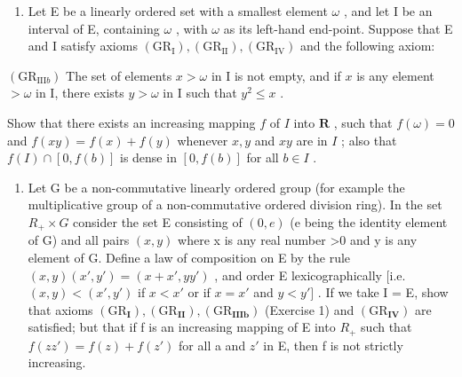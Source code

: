 \ExerciseSection

\begin{enumerate}
\def\labelenumi{\arabic{enumi})}
\tightlist
\item
  Let E be a linearly ordered set with a smallest element \(\omega\) , and let I be an interval of E, containing \(\omega\) , with \(\omega\) as its left-hand end-point. Suppose that E and I satisfy axioms \((\mathrm{GR}_{\mathrm{I}}), (\mathrm{GR}_{\mathrm{II}}), (\mathrm{GR}_{\mathrm{IV}})\) and the following axiom:
\end{enumerate}

\((\mathrm{GR}_{\mathrm{III}b})\) The set of elements \(x > \omega\) in I is not empty, and if \(x\) is any element \(> \omega\) in I, there exists \(y > \omega\) in I such that \(y^2 \leqslant x\) .

Show that there exists an increasing mapping \(f\) of \(I\) into \(\mathbf{R}\) , such that \(f(\omega) = 0\) and \(f(xy) = f(x) + f(y)\) whenever \(x, y\) and \(xy\) are in \(I\) ; also that \(f(I) \cap [0, f(b)]\) is dense in \([0, f(b)]\) for all \(b \in I\) .

\begin{enumerate}
\def\labelenumi{\arabic{enumi})}
\setcounter{enumi}{1}
\tightlist
\item
  Let G be a non-commutative linearly ordered group (for example the multiplicative group of a non-commutative ordered division ring). In the set \(R_{+} \times G\) consider the set E consisting of \((0, e)\) (e being the identity element of G) and all pairs \((x, y)\) where x is any real number \textgreater0 and y is any element of G. Define a law of composition on E by the rule \((x, y)(x', y') = (x + x', yy')\) , and order E lexicographically {[}i.e.~\((x, y) < (x', y')\) if \(x < x'\) or if \(x = x'\) and \(y < y']\) . If we take I = E, show that axioms \((\mathrm{GR}_{\mathbf{I}}), (\mathrm{GR}_{\mathbf{II}}), (\mathrm{GR}_{\mathbf{IIIb}})\) (Exercise 1) and \((\mathrm{GR}_{\mathbf{IV}})\) are satisfied; but that if f is an increasing mapping of E into \(R_{+}\) such that \(f(zz') = f(z) + f(z')\) for all a and \(z'\) in E, then f is not strictly increasing.
\end{enumerate}

